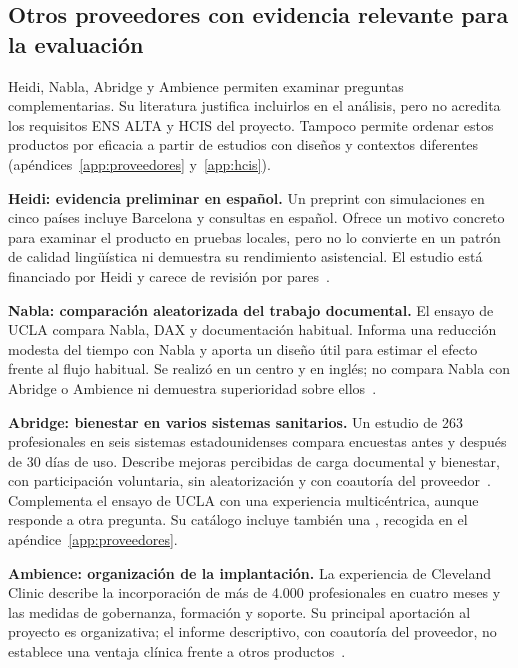 \subsection{Otros proveedores con evidencia relevante para la evaluación}
Heidi, Nabla, Abridge y Ambience permiten examinar preguntas complementarias. Su literatura justifica incluirlos en el análisis, pero no acredita los requisitos ENS ALTA y HCIS del proyecto. Tampoco permite ordenar estos productos por eficacia a partir de estudios con diseños y contextos diferentes (apéndices~\ref{app:proveedores} y~\ref{app:hcis}).

\textbf{Heidi: evidencia preliminar en español.} Un preprint con simulaciones en cinco países incluye Barcelona y consultas en español. Ofrece un motivo concreto para examinar el producto en pruebas locales, pero no lo convierte en un patrón de calidad lingüística ni demuestra su rendimiento asistencial. El estudio está financiado por Heidi y carece de revisión por pares~\cite{heidiSpanish2026}.

\textbf{Nabla: comparación aleatorizada del trabajo documental.} El ensayo de UCLA compara Nabla, DAX y documentación habitual. Informa una reducción modesta del tiempo con Nabla y aporta un diseño útil para estimar el efecto frente al flujo habitual. Se realizó en un centro y en inglés; no compara Nabla con Abridge o Ambience ni demuestra superioridad sobre ellos~\cite{PR93N8FN}.

\textbf{Abridge: bienestar en varios sistemas sanitarios.} Un estudio de 263 profesionales en seis sistemas estadounidenses compara encuestas antes y después de 30 días de uso. Describe mejoras percibidas de carga documental y bienestar, con participación voluntaria, sin aleatorización y con coautoría del proveedor~\cite{olson2025}. Complementa el ensayo de UCLA con una experiencia multicéntrica, aunque responde a otra pregunta. Su catálogo incluye también una , recogida en el apéndice~\ref{app:proveedores}.

\textbf{Ambience: organización de la implantación.} La experiencia de Cleveland Clinic describe la incorporación de más de 4.000 profesionales en cuatro meses y las medidas de gobernanza, formación y soporte. Su principal aportación al proyecto es organizativa; el informe descriptivo, con coautoría del proveedor, no establece una ventaja clínica frente a otros productos~\cite{F5FVUMMX}.
